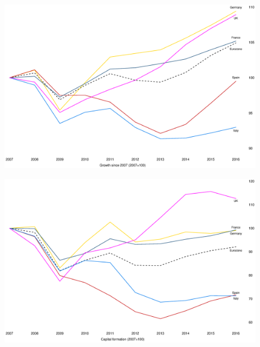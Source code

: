 \documentclass{beamer}
\begin{document}
\begin{frame}
  \begin{figure}
    \includegraphics[scale=.3]{economic_growth.eps}
  \end{figure}
\end{frame}

\begin{frame}
  \begin{figure}
    \includegraphics[scale=.3]{capital_formation.eps}
  \end{figure}
\end{frame}
\end{document}
